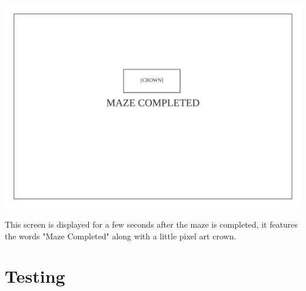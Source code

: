 \documentclass{article}
\begin{document}
\clearpage
\begin{center}
	\includegraphics[scale=0.7]{Maze Completed}

	This screen is displayed for a few seconds after the maze is completed, it features the words "Maze Completed" along with a little pixel art crown.
\end{center}

\clearpage
\part{Testing}
\end{document}
